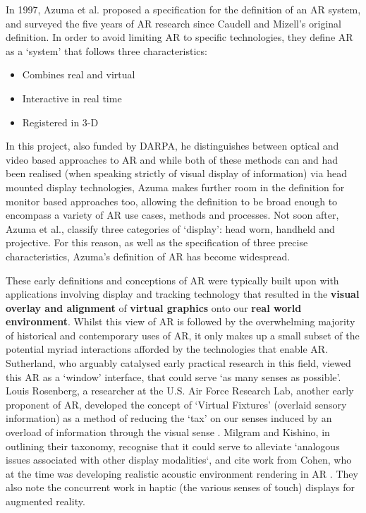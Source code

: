 In 1997, Azuma et al. proposed a specification for the definition of an AR system, and surveyed the five years of AR research since Caudell and Mizell's original definition. In order to avoid limiting AR to specific technologies, they define AR as a `system' that follows three characteristics: 

\begin{itemize}
    \item Combines real and virtual
    \item Interactive in real time
    \item Registered in 3-D
\end{itemize}

In this project, also funded by DARPA, he distinguishes between optical and video based approaches to AR and while both of these methods can and had been realised (when speaking strictly of visual display of information) via head mounted display technologies, Azuma makes further room in the definition for monitor based approaches too, allowing the definition to be broad enough to encompass a variety of AR use cases, methods and processes. Not soon after, Azuma et al., classify three categories of `display': head worn, handheld and projective. For this reason, as well as the specification of three precise characteristics, Azuma’s definition of AR has become widespread. 

These early definitions and conceptions of AR were typically built upon with applications involving display and tracking technology that resulted in the \textbf{visual overlay and alignment} of \textbf{virtual graphics} onto our \textbf{real world environment}. Whilst this view of AR is followed by the overwhelming majority of historical and contemporary uses of AR, it only makes up a small subset of the potential myriad interactions afforded by the technologies that enable AR. Sutherland, who arguably catalysed early practical research in this field, viewed this AR as a `window' interface, that could serve `as many senses as possible'. Louis Rosenberg, a researcher at the U.S. Air Force Research Lab, another early proponent of AR, developed the concept of `Virtual Fixtures' (overlaid sensory information) as a method of reducing the `tax' on our senses induced by an overload of information through the visual sense \citep{rosenberg1993}. Milgram and Kishino, in outlining their taxonomy, recognise that it could serve to alleviate `analogous issues associated with other display modalities`, and cite work from Cohen, who at the time was developing realistic acoustic environment rendering in AR \citeyearpar{cohen1993}. They also note the concurrent work in haptic (the various senses of touch) displays for augmented reality. 

